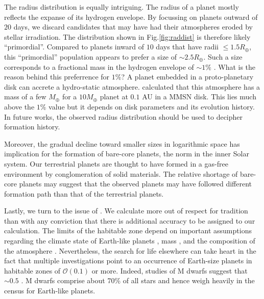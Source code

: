 The radius distribution is equally intriguing. The radius of a 
planet mostly reflects the expanse of its hydrogen envelope.  By
focussing on planets outward of $20$ days, we discard candidates that
may have had their atmospheres eroded by stellar irradiation. The
distribution shown in Fig.\ref{fig:raddist} is therefore likely
``primordial''. Compared to planets inward of $10$ days that have radii
$\leq 1.5 R_\oplus$, this ``primordial'' population appears to prefer a 
size of $\sim 2.5R_\oplus$. Such a size corresponds to a fractional mass in the
hydrogen envelope of $\sim 1\%$ \citep[see, e.g.][]{WuLithwick}. What
is the reason behind this preferrence for $1\%$? A planet embedded in
a proto-planetary disk can accrete a hydro-static
atmosphere. \citet{Rafikov} calculated that this atmosphere has a mass
of a few $M_\oplus$ for a $10 M_\oplus$ planet at $0.1$ AU in a MMSN
disk. This lies much above the $1\%$ value but it depends on disk
parameters and its evolution history.  In future works, the observed
radius distribution should be used to decipher formation history.

Moreover, the gradual decline toward smaller
sizes in logarithmic space has implication for the formation of
bare-core planets, the norm in the inner Solar
system. Our terrestrial planets are thought to have formed in a
gas-free environment by conglomeration of solid materials. The
relative shortage of bare-core planets may suggest that the 
observed \kep{} planets may have followed different formation path 
than that of the terrestrial planets.

Lastly, we turn to the issue of \ee{}. We calculate \ee{} more out of
respect for tradition than with any conviction that there is
additional accuracy to be assigned to our calculation.  The limits of
the habitable zone depend on important assumptions regarding the
climate state of Earth-like planets \citep{Kopparapu2013a}, mass
\citep{Kopparapu2014}, and the composition of the atmosphere
\citep{Pierrehumbert2011}.  Nevertheless, the search for life
elsewhere can take heart in the fact that multiple investigations
point to an occurrence of Earth-size planets in habitable zones of
$\mathcal{O}(0.1)$ or more.  Indeed, studies of M dwarfs suggest that
\ee{} $\sim 0.5$ \citep{Bonfils2013,Kopparapu2013b,Gaidos2013}.  M
dwarfs comprise about 70\% of all stars and hence weigh heavily in the
census for Earth-like planets.

